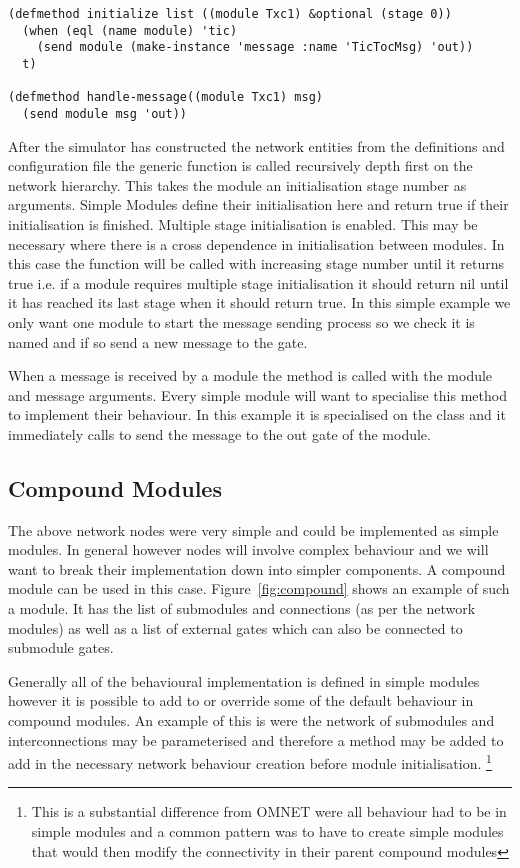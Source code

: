 \documentclass[a4paper,11pt,twoside,openany]{report}
\begin{document}
\begin{lstlisting}[caption={Txc1 Behavioural implementation},label={lst:txc1-impl}]
(defmethod initialize list ((module Txc1) &optional (stage 0))
  (when (eql (name module) 'tic)
    (send module (make-instance 'message :name 'TicTocMsg) 'out))
  t)

(defmethod handle-message((module Txc1) msg)
  (send module msg 'out))
\end{lstlisting}

After the simulator has constructed the network entities from the
definitions and configuration file the  generic
function is called recursively depth first on the network hierarchy.
This takes the module an initialisation stage number as
arguments. Simple Modules define their initialisation here and return
true if their initialisation is finished. Multiple stage
initialisation is enabled. This may be necessary where there is a
cross dependence in initialisation between modules. In this case the
 function will be called with increasing stage number
until it returns true i.e. if a module requires multiple stage
initialisation it should return nil until it has reached its last
stage when it should return true. In this simple example we only want
one module to start the message sending process so we check it is
named  and if so send a new message to the  gate.

When a message is received by a module the  method is
called with the module and message arguments. Every simple module will
want to specialise this method to implement their behaviour. In this
example it is specialised on the  class and it immediately
calls  to send the message to the out gate of the module.

\subsection{Compound Modules}
The above network nodes were very simple and could be implemented as
simple modules. In general however nodes will involve complex
behaviour and we will want to break their implementation down into
simpler components. A compound module can be used in this
case. Figure~\ref{fig:compound} shows an example of such a module. It
has the list of submodules and connections (as per the network
modules) as well as a list of external gates which can also be
connected to submodule gates.

Generally all of the behavioural implementation is defined in simple
modules however it is possible to add to or override some of the
default behaviour in compound modules. An example of this is were the
network of submodules and interconnections may be parameterised and
therefore a method may be added to add in the necessary network
behaviour creation before module initialisation. \footnote{This is a
  substantial difference from OMNET were all behaviour had to be in
  simple modules and a common pattern was to have to create simple
  modules that would then modify the connectivity in their parent
  compound modules}
\end{document}
